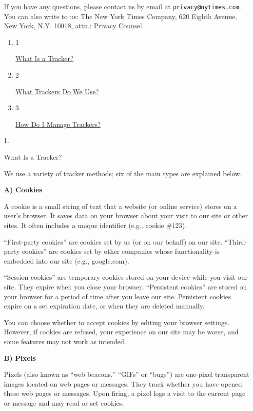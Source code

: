 If you have any questions, please contact us by email at
\href{mailto:privacy@nytimes.com}{\nolinkurl{privacy@nytimes.com}}. You
can also write to us: The New York Times Company, 620 Eighth Avenue, New
York, N.Y. 10018, attn.: Privacy Counsel.

\begin{enumerate}
\def\labelenumi{\arabic{enumi}.}
\item
  1

  \href{what-is-a-tracker}{What Is a Tracker?}
\item
  2

  \href{what-trackers-do-we-use}{What Trackers Do We Use?}
\item
  3

  \href{how-do-i-manage-trackers}{How Do I Manage Trackers?}
\end{enumerate}

1.

What Is a Tracker?

We use a variety of tracker methods; six of the main types are explained
below.

\textbf{A) Cookies}

A cookie is a small string of text that a website (or online service)
stores on a user's browser. It saves data on your browser about your
visit to our site or other sites. It often includes a unique identifier
(e.g., cookie \#123).

``First-party cookies'' are cookies set by us (or on our behalf) on our
site. ``Third-party cookies'' are cookies set by other companies whose
functionality is embedded into our site (e.g., google.com).

``Session cookies'' are temporary cookies stored on your device while
you visit our site. They expire when you close your browser.
``Persistent cookies'' are stored on your browser for a period of time
after you leave our site. Persistent cookies expire on a set expiration
date, or when they are deleted manually.

You can choose whether to accept cookies by editing your browser
settings. However, if cookies are refused, your experience on our site
may be worse, and some features may not work as intended.

\textbf{B) Pixels}

Pixels (also known as ``web beacons,'' ``GIFs'' or ``bugs'') are
one-pixel transparent images located on web pages or messages. They
track whether you have opened these web pages or messages. Upon firing,
a pixel logs a visit to the current page or message and may read or set
cookies.


